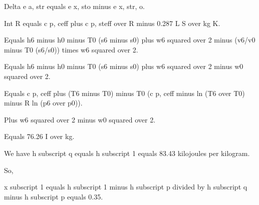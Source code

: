 Delta e a, str equals e x, sto minus e x, str, o.

Int R equals c p, ceff plus c p, steff over R minus 0.287 L S over kg K.

Equals h6 minus h0 minus T0 (s6 minus s0) plus w6 squared over 2 minus (v6/v0 minus T0 (s6/s0)) times w6 squared over 2.

Equals h6 minus h0 minus T0 (s6 minus s0) plus w6 squared over 2 minus w0 squared over 2.

Equals c p, ceff plus (T6 minus T0) minus T0 (c p, ceff minus ln (T6 over T0) minus R ln (p6 over p0)).

Plus w6 squared over 2 minus w0 squared over 2.

Equals 76.26 I over kg.

We have h subscript q equals h subscript 1 equals 83.43 kilojoules per kilogram.

So, 

x subscript 1 equals h subscript 1 minus h subscript p divided by h subscript q minus h subscript p equals 0.35.